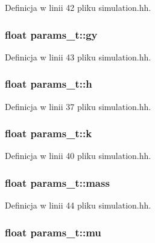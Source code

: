 Definicja w linii 42 pliku simulation.\-hh.

\hypertarget{structparams__t_a0da484b4cc6a542875aa7b92e200f507}{
\subsubsection[{gy}]{\setlength{\rightskip}{0pt plus 5cm}float params\-\_\-t\-::gy}}\label{structparams__t_a0da484b4cc6a542875aa7b92e200f507}


Definicja w linii 43 pliku simulation.\-hh.

\hypertarget{structparams__t_a27d76064f2ae0cb93a0956027cfcc19b}{
\subsubsection[{h}]{\setlength{\rightskip}{0pt plus 5cm}float params\-\_\-t\-::h}}\label{structparams__t_a27d76064f2ae0cb93a0956027cfcc19b}


Definicja w linii 37 pliku simulation.\-hh.

\hypertarget{structparams__t_a97ee2783cf89cee1151be3250e9054b3}{
\subsubsection[{k}]{\setlength{\rightskip}{0pt plus 5cm}float params\-\_\-t\-::k}}\label{structparams__t_a97ee2783cf89cee1151be3250e9054b3}


Definicja w linii 40 pliku simulation.\-hh.

\hypertarget{structparams__t_afe4a59fe43565a71a0a7a155714e2af1}{
\subsubsection[{mass}]{\setlength{\rightskip}{0pt plus 5cm}float params\-\_\-t\-::mass}}\label{structparams__t_afe4a59fe43565a71a0a7a155714e2af1}


Definicja w linii 44 pliku simulation.\-hh.

\hypertarget{structparams__t_a971359c29b2f946b477e4a1b3605fa3f}{
\subsubsection[{mu}]{\setlength{\rightskip}{0pt plus 5cm}float params\-\_\-t\-::mu}}\label{structparams__t_a971359c29b2f946b477e4a1b3605fa3f}


